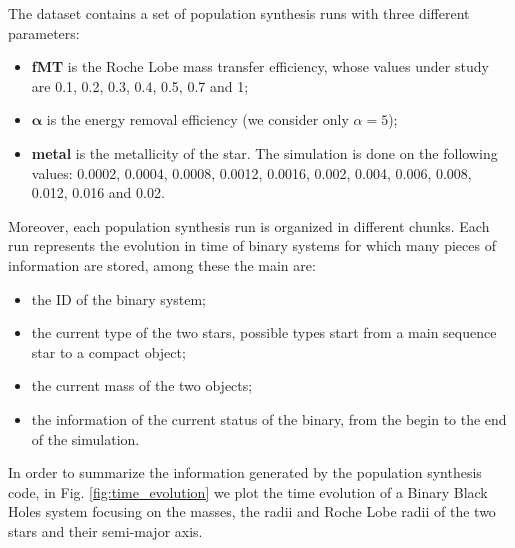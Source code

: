 \documentclass[prb,twocolumn,9pt]{revtex4-1}
\begin{document}
The dataset contains a set of population synthesis runs with three different parameters:
\begin{itemize}
    \item \textbf{fMT} is the Roche Lobe mass transfer efficiency, whose values under study are 0.1, 0.2, 0.3, 0.4, 0.5, 0.7 and 1;
    \item $\pmb{\alpha}$ is the energy removal efficiency (we consider only $\alpha=5$);
    \item \textbf{metal} is the metallicity of the star. The simulation is done on the following values: 0.0002, 0.0004, 0.0008, 0.0012, 0.0016, 0.002, 0.004, 0.006, 0.008, 0.012, 0.016 and 0.02.
\end{itemize}
Moreover, each population synthesis run is organized in different chunks. 
Each run represents the evolution in time of binary systems for which many pieces of information are stored, among these the main are:
\begin{itemize}
    \item the ID of the binary system;
    \item the current type of the two stars, possible types start from a main sequence star to a compact object;
    \item the current mass of the two objects;
    \item the information of the current status of the binary, from the begin to the end of the simulation. 
\end{itemize}

In order to summarize the information generated by the population synthesis code, in Fig. \ref{fig:time_evolution} we plot the time evolution of a Binary Black Holes system focusing on the masses, the radii and Roche Lobe radii of the two stars and their semi-major axis. 
\end{document}
